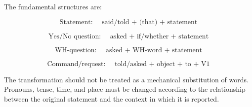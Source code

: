 The fundamental structures are:

\[
\text{Statement: } \quad
\text{said/told + (that) + statement}
\]

\[
\text{Yes/No question: } \quad
\text{asked + if/whether + statement}
\]

\[
\text{WH-question: } \quad
\text{asked + WH-word + statement}
\]

\[
\text{Command/request: } \quad
\text{told/asked + object + to + V1}
\]

The transformation should not be treated as a mechanical substitution of
words. Pronouns, tense, time, and place must be changed according to the
relationship between the original statement and the context in which it is
reported.
